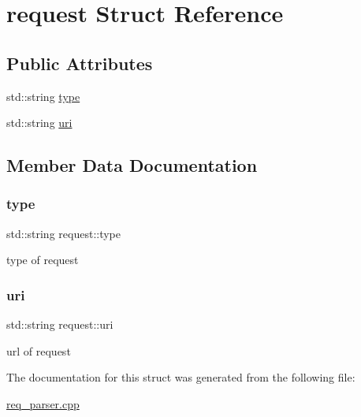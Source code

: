 \hypertarget{structrequest}{}\section{request Struct Reference}
\label{structrequest}
\subsection*{Public Attributes}
\begin{DoxyCompactItemize}
\item 
std\+::string \mbox{\hyperlink{structrequest_a08d328f127a3552604d2ca9c52d7e49d}{type}}
\item 
std\+::string \mbox{\hyperlink{structrequest_a10498642ba403502badb7251e5564403}{uri}}
\end{DoxyCompactItemize}


\subsection{Member Data Documentation}
\mbox{\label{structrequest_a08d328f127a3552604d2ca9c52d7e49d}} 
\subsubsection{\texorpdfstring{type}{type}}
{\footnotesize\ttfamily std\+::string request\+::type}

type of request \mbox{\label{structrequest_a10498642ba403502badb7251e5564403}} 
\subsubsection{\texorpdfstring{uri}{uri}}
{\footnotesize\ttfamily std\+::string request\+::uri}

url of request 

The documentation for this struct was generated from the following file\+:\begin{DoxyCompactItemize}
\item 
\mbox{\hyperlink{req__parser_8cpp}{req\+\_\+parser.\+cpp}}\end{DoxyCompactItemize}
